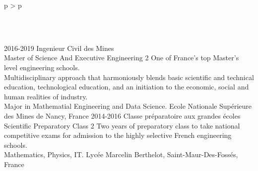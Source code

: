 \documentclass[cv]{cv_style}
\begin{document}
{\begin{tabular}{p{\leftsize\textwidth} > {\arraybackslash}p{\rightsize\textwidth}}
\begin{minipage}[t]{\rightsize\textwidth}
\begin{skillenv}
        \end{skillenv}
        


        \vspace{0.2cm}\\

        \vspace{.2cm}\\
        \begin{liste}
            \educationentry
                {2016-2019}
                {Ingenieur Civil des Mines \\
                Master of Science And Executive Engineering}
                {2}
                {
                    One of France's top Master’s level engineering schools. \\
                    Multidisciplinary approach that harmoniously blends basic scientific and
                    technical education, technological education, and an initiation to
                    the economic, social and human realities of industry. \\
                    Major in Mathematial Engineering and Data Science.
                }
                {
                    Ecole Nationale Supérieure des Mines de Nancy, France
                }
                \educationentry
                {2014-2016}
                {Classe préparatoire aux grandes écoles \\
                    Scientific Preparatory Class
                }
                {2}
                {
                    Two years of preparatory class to take national competitive exams for admission to the
                    highly selective French engineering schools. \\
                    Mathematics, Physics, IT. 
                }
                {
                    Lycée Marcelin Berthelot, Saint-Maur-Des-Fossés, France
                }
                    

\end{liste}
\end{minipage}
\end{tabular}}
\end{document}
